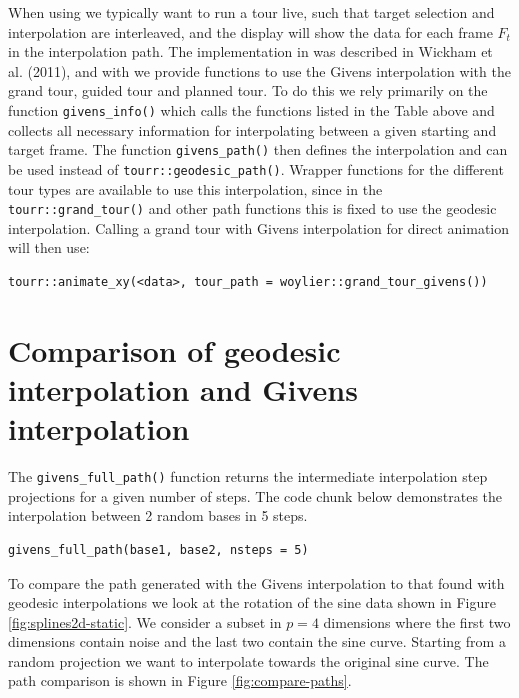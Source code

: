 When using  we typically want to run a tour live, such that target selection and interpolation are interleaved, and the display will show the data for each frame \(F_t\) in the interpolation path. The implementation in  was described in Wickham et al. (2011), and with  we provide functions to use the Givens interpolation with the grand tour, guided tour and planned tour. To do this we rely primarily on the function \texttt{givens\_info()} which calls the functions listed in the Table above and collects all necessary information for interpolating between a given starting and target frame. The function \texttt{givens\_path()} then defines the interpolation and can be used instead of \texttt{tourr::geodesic\_path()}. Wrapper functions for the different tour types are available to use this interpolation, since in the \texttt{tourr::grand\_tour()} and other path functions this is fixed to use the geodesic interpolation. Calling a grand tour with Givens interpolation for direct animation will then use:

\begin{verbatim}
tourr::animate_xy(<data>, tour_path = woylier::grand_tour_givens())
\end{verbatim}

\hypertarget{comparison-of-geodesic-interpolation-and-givens-interpolation}{%
\section{Comparison of geodesic interpolation and Givens interpolation}\label{comparison-of-geodesic-interpolation-and-givens-interpolation}}

The \texttt{givens\_full\_path()} function returns the intermediate interpolation step projections for a given number of steps. The code chunk below demonstrates the interpolation between 2 random bases in 5 steps.

\begin{verbatim}
givens_full_path(base1, base2, nsteps = 5)
\end{verbatim}

To compare the path generated with the Givens interpolation to that found with geodesic interpolations we look at the rotation of the sine data shown in Figure \ref{fig:splines2d-static}. We consider a subset in \(p=4\) dimensions where the first two dimensions contain noise and the last two contain the sine curve. Starting from a random projection we want to interpolate towards the original sine curve. The path comparison is shown in Figure \ref{fig:compare-paths}.

